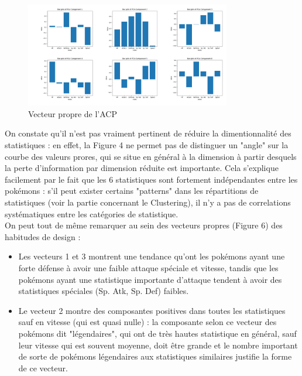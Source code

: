 \documentclass[a4paper,12pt]{article}
\begin{document}
\begin{figure}[htbp]
    \includegraphics[width=0.8\textwidth]{Image/eigen_vector_PCA.png}
    \caption{Vecteur propre de l'ACP}
\end{figure}

On constate qu'il n'est pas vraiment pertinent de réduire la dimentionnalité des
statistiques : en effet, la Figure 4 ne permet pas de distinguer un "angle" sur
la courbe des valeurs prores, qui se situe en général à la dimension à partir
desquels la perte d'information par dimension réduite est importante. Cela
s'explique facilement par le fait que les 6 statistiques sont fortement
indépendantes entre les pokémons : s'il peut exister certains "patterns" dans
les répartitions de statistiques (voir la partie concernant le Clustering), il
n'y a pas de correlations systématiques entre les catégories de statistique. \\
On peut tout de même remarquer au sein des vecteurs propres (Figure 6) des
habitudes de design :
\begin{itemize}
    \item Les vecteurs 1 et 3 montrent une tendance qu'ont les pokémons ayant
    une forte défense à avoir une faible attaque spéciale et vitesse, tandis que
    les pokémons ayant une statistique importante d'attaque tendent à avoir des
    statistiques spéciales (Sp. Atk, Sp. Def) faibles.
    \item Le vecteur 2 montre des composantes positives dans toutes les
    statistiques sauf en vitesse (qui est quasi nulle) : la composante selon ce
    vecteur des pokémons dit "légendaires", qui ont de très hautes statistique
    en général, sauf leur vitesse qui est souvent moyenne, doit être grande et
    le nombre important de sorte de pokémons légendaires aux statistiques
    similaires justifie la forme de ce vecteur.
\end{itemize}
\end{document}

